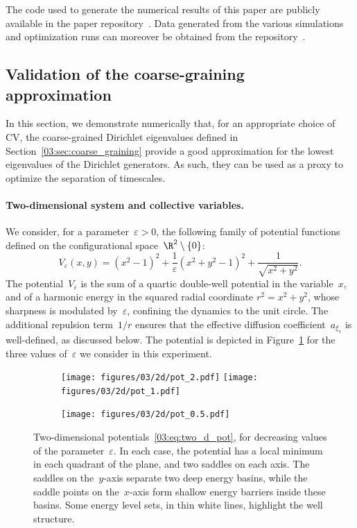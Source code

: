 The code used to generate the numerical results of this paper are publicly available in the paper repository~\cite{github}. Data generated from the various simulations and optimization runs can moreover be obtained from the repository~\cite{data}.

\subsection{Validation of the coarse-graining approximation}
\label{03:subsec:num_coarse_graining}
In this section, we demonstrate numerically that, for an appropriate choice of CV, the coarse-grained Dirichlet eigenvalues defined in Section~\ref{03:sec:coarse_graining} provide a good approximation for the lowest eigenvalues of the Dirichlet generators. As such, they can be used as a proxy to optimize the separation of timescales.
\paragraph{Two-dimensional system and collective variables.}
We consider, for a parameter~$\varepsilon>0$, the following family of potential functions defined on the configurational space~$\R^2\setminus\{0\}$:
\begin{equation}
    \label{03:eq:two_d_pot}
    V_{\varepsilon}(x,y) = (x^2-1)^2 + \frac{1}{\varepsilon}(x^2+y^2-1)^2 + \frac1{\sqrt{x^2+y^2}}.
\end{equation}
The potential~$V_{\varepsilon}$ is the sum of a quartic double-well potential in the variable~$x$, and of a harmonic energy in the squared radial coordinate $r^2=x^2+y^2$, whose sharpness is modulated by~$\varepsilon$, confining the dynamics to the unit circle. The additional repulsion term~$1/r$ ensures that the effective diffusion coefficient~$a_{\xi_1}$ is well-defined, as discussed below.
The potential is depicted in Figure~\ref{03:fig:pot2d} for the three values of~$\varepsilon$ we consider in this experiment.
\begin{figure}
    \begin{subfigure}{\linewidth}
    \center
        \texttt{[image: figures/03/2d/pot\_2.pdf]}
        \texttt{[image: figures/03/2d/pot\_1.pdf]}
    \end{subfigure}
    \begin{subfigure}{\linewidth}
    \center
        \texttt{[image: figures/03/2d/pot\_0.5.pdf]}
    \end{subfigure}
\caption[]{Two-dimensional potentials~\eqref{03:eq:two_d_pot}, for decreasing values of the parameter~$\varepsilon$. In each case, the potential has a local minimum in each quadrant of the plane, and two saddles on each axis. The saddles on the~$y$-axis separate two deep energy basins, while the saddle points on the~$x$-axis form shallow energy barriers inside these basins. Some energy level sets, in thin white lines, highlight the well structure.} 
\label{03:fig:pot2d}
\end{figure}

